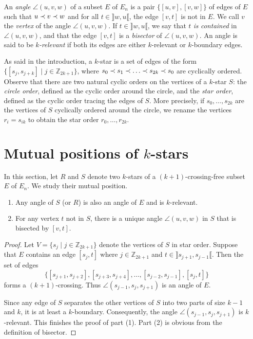 \documentclass[12pt]{amsart}
\begin{document}
An \emph{angle} $\angle(u,v,w)$ of a subset $E$ of $E_n$ is a pair $\{[u,v],[v,w]\}$ of edges of $E$ such that $u\prec v\prec w$ and for all $t\in\rrbracket w,u\llbracket$, the edge $[v,t]$ is not in $E$. We call $v$ the \emph{vertex} of the angle $\angle(u,v,w)$. If $t\in\rrbracket w,u\llbracket$, we say that \emph{$t$ is contained} in $\angle(u,v,w)$, and that the edge $[v,t]$ is a \emph{bisector} of $\angle(u,v,w)$.
An angle is said to be \emph{$k$-relevant} if both its edges are either $k$-relevant or $k$-boundary edges.

As said in the introduction, a $k$-star is a set of edges of the form $\{[s_j,s_{j+k}] \;|\; j\in \mathbb{Z}_{2k+1} \}$, where $s_0\prec s_1 \prec \ldots \prec s_{2k} \prec s_0$ are cyclically ordered.
Observe that there are two natural cyclic orders on the vertices of a $k$-star $S$: the \emph{circle order}, defined as the cyclic order around the circle, and the \emph{star order}, defined as the cyclic order tracing the edges of $S$. More precisely, if $s_0,\ldots,s_{2k}$ are the vertices of $S$ cyclically ordered around the circle, we rename the vertices $r_i=s_{ik}$ to obtain the star order $r_0,\ldots,r_{2k}$.




\section{Mutual positions of $k$-stars}\label{sectionstars}

In this section, let $R$ and $S$ denote  two $k$-stars  of a $(k+1)$-crossing-free subset $E$ of $E_n$.
We study their mutual position.

\begin{lemma}\label{starangles}
\begin{enumerate}
\item Any angle of $S$ (or $R$) is also an angle of $E$ and is $k$-relevant.
\item For any vertex $t$ not in $S$, there is a unique angle $\angle(u,v,w)$ in $S$ that is bisected by $[v,t]$.
\end{enumerate}
\end{lemma}

\begin{proof}
Let $V=\{s_j\;|\; j\in\mathbb{Z}_{2k+1}\}$ denote the vertices of $S$ in star order.
Suppose that $E$ contains an edge $[s_j,t]$ where $j\in\mathbb{Z}_{2k+1}$ and $t\in\rrbracket s_{j+1},s_{j-1}\llbracket$. Then the set of edges $$\{[s_{j+1},s_{j+2}],[s_{j+3},s_{j+4}],\ldots,[s_{j-2},s_{j-1}],[s_j,t]\}$$ forms a $(k+1)$-crossing. Thus $\angle(s_{j-1},s_j,s_{j+1})$ is an angle of $E$.

Since any edge of $S$ separates the other vertices of $S$ into two parts of size $k-1$ and $k$, it is at least a $k$-boundary. Consequently, the angle $\angle(s_{j-1},s_j,s_{j+1})$ is $k$-relevant.
This finishes the proof of part (1). Part (2) is obvious from the definition of bisector.
\end{proof}
\end{document}
